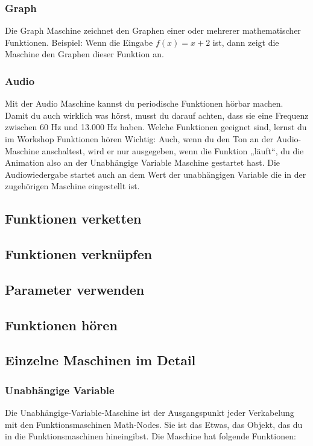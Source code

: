 \documentclass[12pt]{report}
\begin{document}
\subsubsection{Graph}
Die Graph Maschine zeichnet den Graphen einer oder mehrerer mathematischer Funktionen. Beispiel: Wenn die Eingabe $f(x) = x + 2$ ist, dann zeigt die Maschine den Graphen dieser Funktion an.
\subsubsection{Audio}
Mit der Audio Maschine kannst du periodische Funktionen hörbar machen. Damit du auch wirklich was hörst, musst du darauf achten, dass sie eine Frequenz zwischen 60 Hz und 13.000 Hz haben. Welche Funktionen geeignet sind, lernst du im Workshop Funktionen hören  
Wichtig: Auch, wenn du den Ton an der Audio-Maschine anschaltest, wird er nur ausgegeben, wenn die Funktion „läuft“, du die Animation also an der Unabhängige Variable Maschine gestartet hast. Die Audiowiedergabe startet auch an dem Wert der unabhängigen Variable die in der zugehörigen Maschine eingestellt ist.
\subsection{Funktionen verketten}
\subsection{Funktionen verknüpfen}
\subsection{Parameter verwenden}
\subsection{Funktionen hören}
\subsection{Einzelne Maschinen im Detail}
\subsubsection{Unabhängige Variable}
Die Unabhängige-Variable-Maschine ist der Ausgangspunkt jeder Verkabelung mit den Funktionsmaschinen Math-Nodes. Sie ist das Etwas, das Objekt, das du in die Funktionsmaschinen hineingibst. Die Maschine hat folgende Funktionen:
\end{document}
